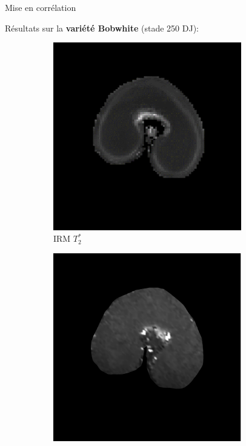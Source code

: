 \documentclass[10pt]{beamer}
\begin{document}
\begin{frame}{Mise en corrélation}

  Résultats sur la \textbf{variété Bobwhite} (stade 250 DJ):

    \begin{figure}[ht]
    \centering
    \begin{subfigure}[t]{0.33\textwidth}
      \centering
      \includegraphics[width=0.9\textwidth]{fig/mri_slice8_250}
      \caption{IRM $T_2^*$}
      \label{subfig:mri_slice8_250}
    \end{subfigure}%
    \begin{subfigure}[t]{0.33\textwidth}
      \centering
      \includegraphics[width=0.9\textwidth]{fig/zonetir_2}

\end{subfigure}
\end{figure}
\end{frame}
\end{document}

